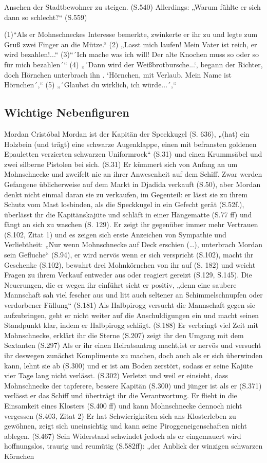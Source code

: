 Ansehen der Stadtbewohner zu steigen. (S.540) Allerdings: „Warum fühlte er sich dann so schlecht?“ (S.559)


(1)“Als er Mohnschneckes Interesse bemerkte, zwinkerte er ihr zu und legte zum Gruß zwei Finger an die Mütze.“
(2) „Lasst mich laufen! Mein Vater ist reich, er wird bezahlen!...“
(3)“´Ich mache was ich will! Der alte Knochen muss so oder so für mich bezahlen´“
(4) „´Dann wird der Weißbrotbursche...`, begann der Richter, doch Hörnchen unterbrach ihn . `Hörnchen, mit Verlaub. Mein Name ist Hörnchen´,“
(5) „´Glaubst du wirklich, ich würde...´,“

\subsection{Wichtige Nebenfiguren}
Mordan
Cristóbal Mordan ist der Kapitän der Speckkugel (S. 636), „(hat) ein Holzbein (und trägt) eine schwarze Augenklappe, einen mit befransten goldenen Epauletten verzierten schwarzen Uniformrock“ (S.31) und einen  Krummsäbel und zwei silberne Pistolen bei sich. (S.31) Er kümmert sich von Anfang an um Mohnschnecke und zweifelt nie an ihrer Anwesenheit auf dem Schiff. Zwar werden Gefangene üblicherweise auf dem Markt in Djadida verkauft (S.50), aber Mordan denkt nicht einmal daran sie zu verkaufen, im Gegenteil:  er lässt sie zu ihrem Schutz vom Mast losbinden, als die Speckkugel in ein Gefecht gerät (S.52f.), überlässt ihr die Kapitänskajüte und schläft in einer Hängematte (S.77 ff) und fängt an sich zu waschen (S. 129). Er zeigt ihr gegenüber immer mehr Vertrauen (S.102, Zitat 1) und es zeigen sich erste Anzeichen von Sympathie und Verliebtheit: „Nur wenn Mohnschnecke auf Deck erschien (…), unterbrach Mordan sein Gefluche“ (S.94), er wird nervös wenn er sich verspricht (S.102), macht ihr Geschenke (S.102), bewahrt drei Mohnkörnchen von ihr auf (S. 182) und weicht Fragen zu ihrem Verkauf entweder aus oder reagiert gereizt (S.129, S.145). Die Neuerungen, die er wegen ihr einführt sieht er positiv, „denn eine saubere Mannschaft sah viel fescher aus und litt auch seltener an Schimmelschnupfen oder verdorbener Füllung“ (S.181) Als Halbpirogg versucht die Mannschaft gegen sie aufzubringen, geht er nicht weiter auf die Anschuldigungen ein und macht seinen Standpunkt klar, indem er Halbpirogg schlägt. (S.188) Er verbringt viel Zeit mit Mohnschnecke, erklärt ihr die Sterne (S.207) zeigt ihr den Umgang mit dem Sextanten (S.297) Als er ihr einen Heiratsantrag macht,ist er nervös und versucht ihr deswegen zunächst Komplimente zu machen, doch auch als er sich überwinden kann,  lehnt sie ab (S.300) und er ist am Boden zerstört, sodass er seine Kajüte vier Tage lang nicht verlässt. (S.302) Verletzt und weil er einsieht, dass Mohnschnecke der tapferere, bessere Kapitän (S.300) und jünger ist als er (S.371) verlässt er das Schiff und überträgt ihr die Verantwortung. Er flieht in die Einsamkeit eines Klosters (S.400 ff) und kann Mohnschnecke dennoch nicht vergessen (S.403, Zitat 2) Er hat Schwierigkeiten sich ans Klosterleben zu gewöhnen, zeigt sich uneinsichtig und kann seine Piroggeneigenschaften nicht ablegen. (S.467) Sein Widerstand schwindet jedoch als er eingemauert wird hoffnungslos, traurig und reumütig (S.582ff): „der Anblick der winzigen schwarzen Körnchen 